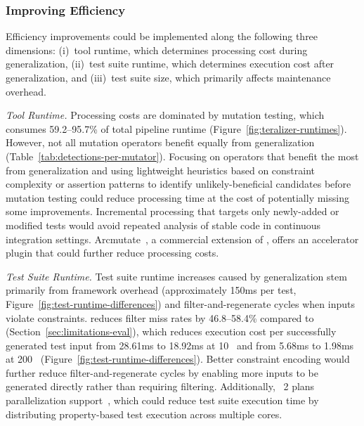 \subsubsection{Improving Efficiency}

Efficiency improvements could be implemented along the following three dimensions:
(i)~tool runtime, which determines processing cost during generalization,
(ii)~test suite runtime, which determines execution cost after generalization,
and (iii)~test suite size, which primarily affects maintenance overhead.

\textit{Tool Runtime.}
Processing costs are dominated by mutation testing,
which consumes 59.2--95.7\% of total pipeline runtime
(Figure~\ref{fig:teralizer-runtimes}).
However, not all mutation operators benefit equally from generalization
(Table~\ref{tab:detections-per-mutator}).
Focusing on operators that benefit the most from generalization
and using lightweight heuristics based on constraint complexity
or assertion patterns to identify unlikely-beneficial candidates before mutation testing
could reduce processing time at the cost of potentially missing some improvements.
Incremental processing that targets only newly-added or modified tests
would avoid repeated analysis of stable code in continuous integration settings.
Arcmutate~\cite{arcmutate_2024}, a commercial extension of \ToolPit{},
offers an accelerator plugin that could further reduce processing costs.

\textit{Test Suite Runtime.}
Test suite runtime increases caused by generalization stem primarily from \ToolJqwik{} framework overhead
(approximately 150ms per test, Figure~\ref{fig:test-runtime-differences})
and filter-and-regenerate cycles when inputs violate constraints.
\VariantImproved{} reduces filter miss rates by 46.8--58.4\%
compared to \VariantNaive{} (Section~\ref{sec:limitations-eval}),
which reduces execution cost per successfully generated test input from 28.61ms to 18.92ms at 10~\tries{}
and from 5.68ms to 1.98ms at 200~\tries{} (Figure~\ref{fig:test-runtime-differences}).
Better constraint encoding would further reduce filter-and-regenerate cycles
by enabling more inputs to be generated directly rather than requiring filtering.
Additionally, \ToolJqwik{}~2 plans parallelization support~\cite{link_2024_jqwik2},
which could reduce test suite execution time
by distributing property-based test execution across multiple cores.

